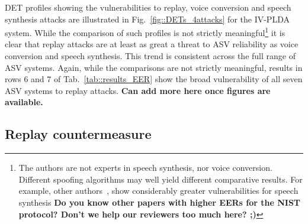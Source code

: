 DET profiles showing the vulnerabilities to replay, voice conversion and speech synthesis attacks are illustrated in Fig.~\ref{fig::DETs_4attacks} for the IV-PLDA system.  While the comparison of such profiles is not strictly meaningful\footnote{The authors are not experts in speech synthesis, nor voice conversion.  Different spoofing algorithms may well yield different comparative results. For example, other authors~\cite{DeLeon2012}, show considerably greater vulnerabilities for speech synthesis \bfseries{Do you know other papers with higher EERs for the NIST protocol? Don't we help our reviewers too much here? ;)}} it is clear that replay attacks are at least as great a threat to ASV reliability as voice conversion and speech synthesis.  This trend is consistent across the full range of ASV systems.  Again, while the comparisons are not strictly meaningful, results in rows 6 and 7 of Tab.~\ref{tab::results_EER} show the broad vulnerability of all seven ASV systems to replay attacks. {\bfseries Can add more here once figures are available.}









\subsection{Replay countermeasure}


